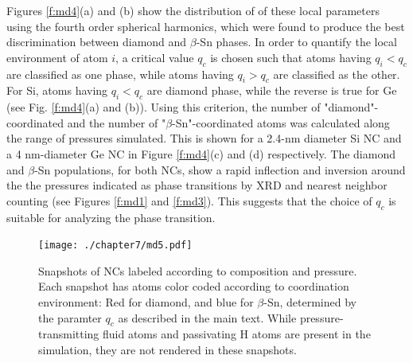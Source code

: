 Figures \ref{f:md4}(a) and (b) show the distribution of of these local parameters using the fourth order spherical harmonics, which were found to produce the best discrimination between diamond and $\beta$-Sn phases. In order to quantify the local environment of atom $i$, a critical value $q_c$ is chosen such that atoms having $q_i < q_c$ are classified as one phase, while atoms having $q_i > q_c$ are classified as the other. For Si, atoms having $q_i < q_c$ are diamond phase, while the reverse is true for Ge (see Fig. \ref{f:md4}(a) and (b)). Using this criterion, the number of "diamond"-coordinated and the number of "$\beta$-Sn"-coordinated atoms was calculated along the range of pressures simulated. This is shown for a 2.4-nm diameter Si NC and a 4 nm-diameter Ge NC in Figure \ref{f:md4}(c) and (d) respectively. The diamond and $\beta$-Sn populations, for both NCs, show a rapid inflection and inversion around the the pressures indicated as phase transitions by XRD and nearest neighbor counting (see Figures \ref{f:md1} and \ref{f:md3}). This suggests that the choice of $q_c$ is suitable for analyzing the phase transition.\par

\begin{figure}
\begin{center}
\texttt{[image: ./chapter7/md5.pdf]}
\caption[Snapshots from MD simulations of NC pressurization color-coded according to ordering parameter analysis.]{Snapshots of NCs labeled according to composition and pressure. Each snapshot has atoms color coded according to coordination environment: Red for diamond, and blue for $\beta$-Sn, determined by the paramter $q_c$ as described in the main text. While pressure-transmitting fluid atoms and passivating H atoms are present in the simulation, they are not rendered in these snapshots.}
\label{f:md5}
\end{center}
\end{figure}

